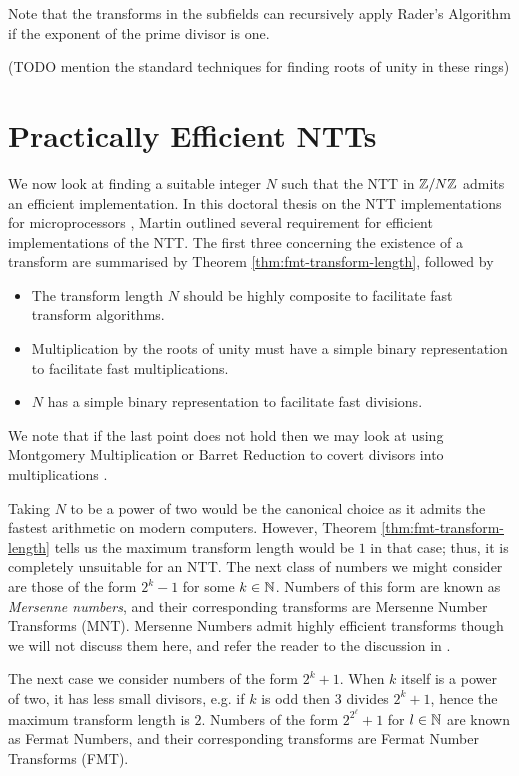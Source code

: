 Note that the transforms in the subfields can recursively apply Rader's Algorithm if the exponent of the prime divisor is one.

(TODO mention the standard techniques for finding roots of unity in these rings)


\section{Practically Efficient NTTs}%
\label{sec:practically-efficient-ntt}

We now look at finding a suitable integer $N$ such that the NTT in ${\mathbb Z} / N{\mathbb Z}$ admits an efficient implementation. In this doctoral thesis on the NTT implementations for microprocessors \cite{ntt-thesis}, Martin outlined several requirement for efficient implementations of the NTT. The first three concerning the existence of a transform are summarised by Theorem \ref{thm:fmt-transform-length}, followed by
\begin{itemize}
    \item The transform length $N$ should be highly composite to facilitate fast transform algorithms.
    \item Multiplication by the roots of unity must have a simple binary representation to facilitate fast multiplications.
    \item $N$ has a simple binary representation to facilitate fast divisions.
\end{itemize}

We note that if the last point does not hold then we may look at using Montgomery Multiplication or Barret Reduction to covert divisors into multiplications \cite{barret}.

Taking $N$ to be a power of two would be the canonical choice as it admits the fastest arithmetic on modern computers. However, Theorem \ref{thm:fmt-transform-length} tells us the maximum transform length would be $1$ in that case; thus, it is completely unsuitable for an NTT. The next class of numbers we might consider are those of the form $2^k - 1$ for some $k \in {\mathbb N}$. Numbers of this form are known as \textit{Mersenne numbers}, and their corresponding transforms are Mersenne Number Transforms (MNT). Mersenne Numbers admit highly efficient transforms though we will not discuss them here, and refer the reader to the discussion in \cite{mersenne} \cite{mersenne-recent}.

The next case we consider numbers of the form $2^k + 1$. When $k$ itself is a power of two, it has less small divisors, e.g. if $k$ is odd then $3$ divides $2^k + 1$, hence the maximum transform length is $2$. Numbers of the form $2^{2^\ell} + 1$ for $l \in {\mathbb N}$ are known as Fermat Numbers, and their corresponding transforms are Fermat Number Transforms (FMT).

